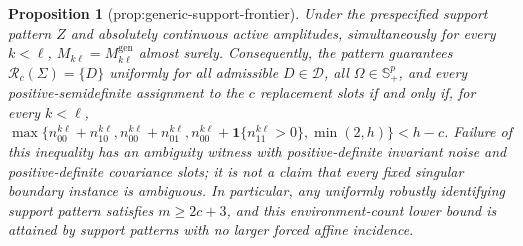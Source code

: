 \documentclass{article}
\newtheorem{proposition}{Proposition}
\begin{document}
\begin{proposition}[prop:generic-support-frontier]\label{prop:generic-support-frontier}
Under the prespecified support pattern \(Z\) and absolutely continuous active amplitudes, simultaneously for every \(k<\ell\), \(M_{k\ell}=M_{k\ell}^{\mathrm{gen}}\) almost surely. Consequently, the pattern guarantees \(\mathcal R_c(\Sigma)=\{D\}\) uniformly for all admissible \(D\in\mathcal D\), all \(\Omega\in\mathbb S_{+}^{p}\), and every positive-semidefinite assignment to the \(c\) replacement slots if and only if, for every \(k<\ell\), \(\max\{n_{00}^{k\ell}+n_{10}^{k\ell},n_{00}^{k\ell}+n_{01}^{k\ell},n_{00}^{k\ell}+\mathbf 1\{n_{11}^{k\ell}>0\},\min(2,h)\}<h-c\). Failure of this inequality has an ambiguity witness with positive-definite invariant noise and positive-definite covariance slots; it is not a claim that every fixed singular boundary instance is ambiguous. In particular, any uniformly robustly identifying support pattern satisfies \(m\ge2c+3\), and this environment-count lower bound is attained by support patterns with no larger forced affine incidence.
\end{proposition}
\end{document}
